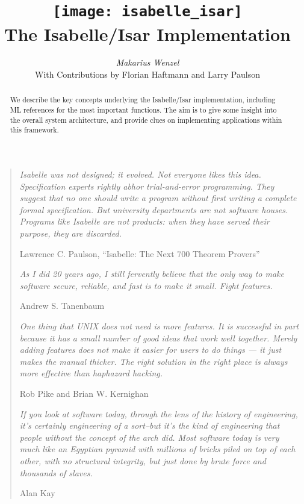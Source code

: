 \documentclass[12pt,a4paper,fleqn]{report}
\title{\texttt{[image: isabelle\_isar]}
  \\[4ex] The Isabelle/Isar Implementation}
\author{\emph{Makarius Wenzel}  \\[3ex]
  With Contributions by
  Florian Haftmann
  and Larry Paulson
}
\begin{document}
\maketitle

\begin{abstract}
  We describe the key concepts underlying the Isabelle/Isar
  implementation, including ML references for the most important
  functions.  The aim is to give some insight into the overall system
  architecture, and provide clues on implementing applications within
  this framework.
\end{abstract}

\vspace*{2.5cm}
\begin{quote}

  {\small\em Isabelle was not designed; it evolved.  Not everyone
    likes this idea.  Specification experts rightly abhor
    trial-and-error programming.  They suggest that no one should
    write a program without first writing a complete formal
    specification. But university departments are not software houses.
    Programs like Isabelle are not products: when they have served
    their purpose, they are discarded.}

  Lawrence C. Paulson, ``Isabelle: The Next 700 Theorem Provers''

  \vspace*{1cm}

  {\small\em As I did 20 years ago, I still fervently believe that the
    only way to make software secure, reliable, and fast is to make it
    small.  Fight features.}

  Andrew S. Tanenbaum

  \vspace*{1cm}

  {\small\em One thing that UNIX does not need is more features. It is
    successful in part because it has a small number of good ideas
    that work well together. Merely adding features does not make it
    easier for users to do things --- it just makes the manual
    thicker. The right solution in the right place is always more
    effective than haphazard hacking.}

  Rob Pike and Brian W. Kernighan

  \vspace*{1cm}

  {\small\em If you look at software today, through the lens of the
    history of engineering, it's certainly engineering of a sort--but
    it's the kind of engineering that people without the concept of
    the arch did. Most software today is very much like an Egyptian
    pyramid with millions of bricks piled on top of each other, with
    no structural integrity, but just done by brute force and
    thousands of slaves.}

  Alan Kay

\end{quote}
\end{document}
